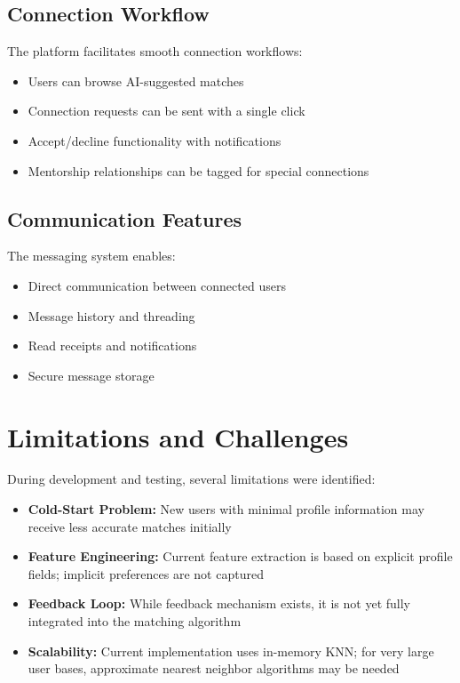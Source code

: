 \documentclass[12pt,a4paper]{report}
\let\origsection\section
\renewcommand{\section}{\needspace{4\baselineskip}\origsection}
\let\origsubsection\subsection
\renewcommand{\subsection}{\needspace{4\baselineskip}\origsubsection}
\begin{document}
\subsection{Connection Workflow}

The platform facilitates smooth connection workflows:
\begin{itemize}[noitemsep]
    \item Users can browse AI-suggested matches
    \item Connection requests can be sent with a single click
    \item Accept/decline functionality with notifications
    \item Mentorship relationships can be tagged for special connections
\end{itemize}

\subsection{Communication Features}

The messaging system enables:
\begin{itemize}[noitemsep]
    \item Direct communication between connected users
    \item Message history and threading
    \item Read receipts and notifications
    \item Secure message storage
\end{itemize}

\section{Limitations and Challenges}

During development and testing, several limitations were identified:

\begin{itemize}[noitemsep]
    \item \textbf{Cold-Start Problem:} New users with minimal profile information may receive less accurate matches initially
    \item \textbf{Feature Engineering:} Current feature extraction is based on explicit profile fields; implicit preferences are not captured
    \item \textbf{Feedback Loop:} While feedback mechanism exists, it is not yet fully integrated into the matching algorithm
    \item \textbf{Scalability:} Current implementation uses in-memory KNN; for very large user bases, approximate nearest neighbor algorithms may be needed
\end{itemize}
\end{document}
